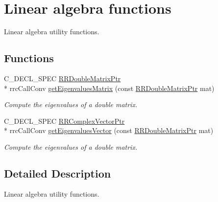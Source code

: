 \hypertarget{group___linear_algebra}{\section{Linear algebra functions}
\label{group___linear_algebra}
}


Linear algebra utility functions.  


\subsection*{Functions}
\begin{DoxyCompactItemize}
\item 
C\-\_\-\-D\-E\-C\-L\-\_\-\-S\-P\-E\-C \hyperlink{rrc__types_8h_ae586a879d30f0823087e42d93464b5dd}{R\-R\-Double\-Matrix\-Ptr} \\*
rrc\-Call\-Conv \hyperlink{group___linear_algebra_ga142092d1f7edcc6500f1b965abed68be}{get\-Eigenvalues\-Matrix} (const \hyperlink{rrc__types_8h_ae586a879d30f0823087e42d93464b5dd}{R\-R\-Double\-Matrix\-Ptr} mat)
\begin{DoxyCompactList}\small\item\em Compute the eigenvalues of a double matrix. \end{DoxyCompactList}\item 
C\-\_\-\-D\-E\-C\-L\-\_\-\-S\-P\-E\-C \hyperlink{rrc__types_8h_ae05c63419a6ca0575eb327fd04dae4b5}{R\-R\-Complex\-Vector\-Ptr} \\*
rrc\-Call\-Conv \hyperlink{group___linear_algebra_ga9902e4c49cc0334f2d2b297b977856c3}{get\-Eigenvalues\-Vector} (const \hyperlink{rrc__types_8h_ae586a879d30f0823087e42d93464b5dd}{R\-R\-Double\-Matrix\-Ptr} mat)
\begin{DoxyCompactList}\small\item\em Compute the eigenvalues of a double matrix. \end{DoxyCompactList}\end{DoxyCompactItemize}


\subsection{Detailed Description}
Linear algebra utility functions. 

